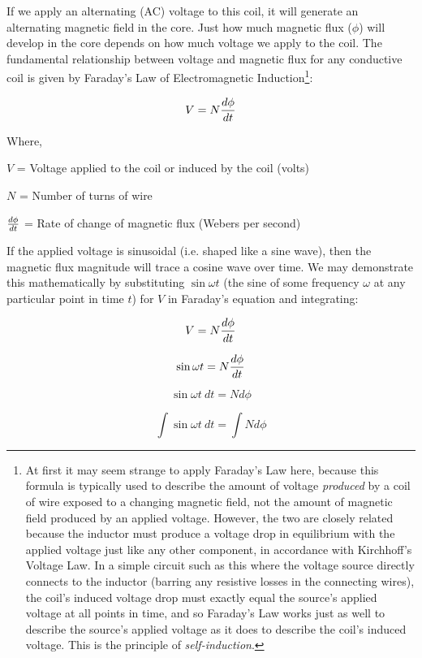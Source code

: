 If we apply an alternating (AC) voltage to this coil, it will generate an alternating magnetic field in the core.  Just how much magnetic flux ($\phi$) will develop in the core depends on how much voltage we apply to the coil.  The fundamental relationship between voltage and magnetic flux for any conductive coil is given by Faraday's Law of Electromagnetic Induction\footnote{At first it may seem strange to apply Faraday's Law here, because this formula is typically used to describe the amount of voltage \textit{produced} by a coil of wire exposed to a changing magnetic field, not the amount of magnetic field produced by an applied voltage.  However, the two are closely related because the inductor must produce a voltage drop in equilibrium with the applied voltage just like any other component, in accordance with Kirchhoff's Voltage Law.  In a simple circuit such as this where the voltage source directly connects to the inductor (barring any resistive losses in the connecting wires), the coil's induced voltage drop must exactly equal the source's applied voltage at all points in time, and so Faraday's Law works just as well to describe the source's applied voltage as it does to describe the coil's induced voltage.  This is the principle of \textit{self-induction}.}:      

$$V = N {d \phi \over dt}$$

\noindent
Where,

$V$ = Voltage applied to the coil or induced by the coil (volts)

$N$ = Number of turns of wire

$d \phi \over dt$ = Rate of change of magnetic flux (Webers per second)

\vskip 10pt

\filbreak

If the applied voltage is sinusoidal (i.e. shaped like a sine wave), then the magnetic flux magnitude will trace a cosine wave over time.  We may demonstrate this mathematically by substituting $\sin \omega t$ (the sine of some frequency $\omega$ at any particular point in time $t$) for $V$ in Faraday's equation and integrating: 

$$V = N {d \phi \over dt}$$

$$\sin \omega t = N {d \phi \over dt}$$

$$\sin \omega t \> dt = N d \phi$$

$$\int \sin \omega t \> dt = \int N d \phi$$

